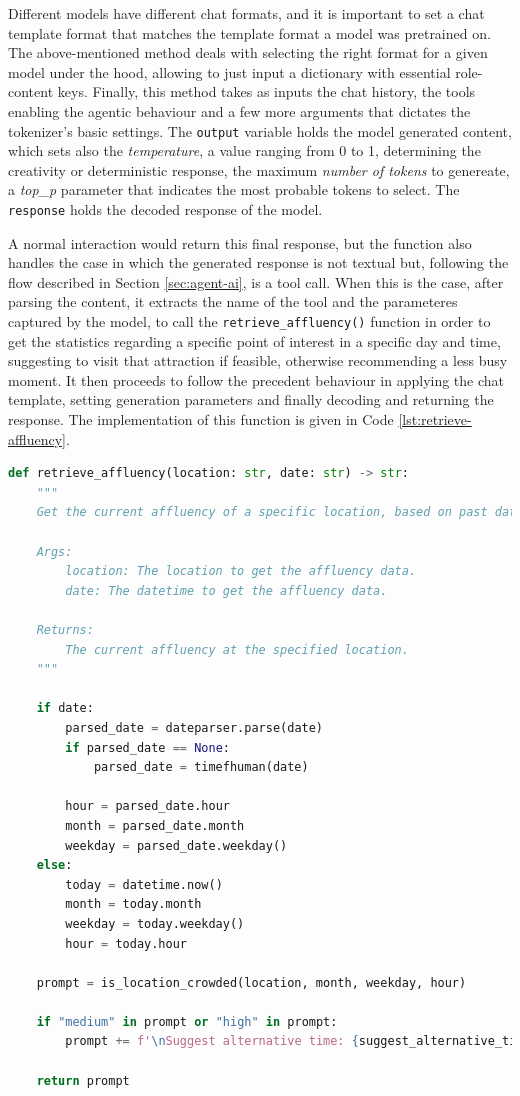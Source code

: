 Different models have different chat formats, and it is important to set a chat template format that matches the template format a model was pretrained on. The above-mentioned method deals with selecting the right format for a given model under the hood, allowing to just input a dictionary with essential role-content keys.
Finally, this method takes as inputs the chat history, the tools enabling the agentic behaviour and a few more arguments that dictates the tokenizer's basic settings.
The \texttt{output} variable holds the model generated content, which sets also the \textit{temperature}, a value ranging from 0 to 1, determining the creativity or deterministic response, the maximum \textit{number of tokens} to genereate, a \textit{top\_p} parameter that indicates the most probable tokens to select. The \texttt{response} holds the decoded response of the model.

A normal interaction would return this final response, but the function also handles the case in which the generated response is not textual but, following the flow described in Section \ref{sec:agent-ai}, is a tool call. When this is the case, after parsing the content, it extracts the name of the tool and the parameteres captured by the model, to call the \texttt{retrieve\_affluency()} function in order to get the statistics regarding a specific point of interest in a specific day and time, suggesting to visit that attraction if feasible, otherwise recommending a less busy moment. It then proceeds to follow the precedent behaviour in applying the chat template, setting generation parameters and finally decoding and returning the response. The implementation of this function is given in Code \ref{lst:retrieve-affluency}.

\begin{center}
\begin{lstlisting}[language=Python, frame=single, caption=\texttt{retrieve\_affluency()} Function.]
def retrieve_affluency(location: str, date: str) -> str:
    """
    Get the current affluency of a specific location, based on past data.

    Args:
        location: The location to get the affluency data.
        date: The datetime to get the affluency data.

    Returns:
        The current affluency at the specified location.
    """

    if date:
        parsed_date = dateparser.parse(date)
        if parsed_date == None:
            parsed_date = timefhuman(date)

        hour = parsed_date.hour
        month = parsed_date.month
        weekday = parsed_date.weekday()
    else:
        today = datetime.now()
        month = today.month
        weekday = today.weekday()
        hour = today.hour

    prompt = is_location_crowded(location, month, weekday, hour)

    if "medium" in prompt or "high" in prompt:
        prompt += f'\nSuggest alternative time: {suggest_alternative_time(location, month, weekday)}.'

    return prompt
\end{lstlisting}
\label{lst:retrieve-affluency}
\end{center}

